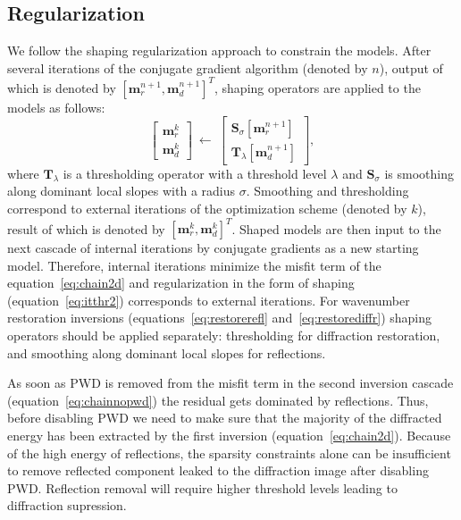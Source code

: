 \subsection{Regularization}
We follow the shaping regularization approach \cite[]{fomel2007shaping} to constrain the models. 
After several iterations of the conjugate
gradient algorithm (denoted by $n$), output of which is denoted by $[\mathbf{m}_r^{n+1},\mathbf{m}_d^{n+1}]^T$,
shaping operators are applied to the models as follows:
\begin{equation}
\label{eq:itthr2}
\begin{bmatrix}\mathbf{m}_{r}^{k} \\ \mathbf{m}_d^k\end{bmatrix}\ \leftarrow\ \begin{bmatrix} \mathbf{S}_{\sigma}[\mathbf{m}_{r}^{n+1}] \\ \mathbf{T}_{\lambda}[\mathbf{m}_{d}^{n+1}]\end{bmatrix},
\end{equation}
where $\mathbf{T}_{\lambda}$ is a thresholding operator with a threshold level $\lambda$ and $\mathbf{S}_{\sigma}$ is smoothing
along dominant local slopes with a radius $\sigma$. Smoothing and thresholding correspond to external iterations of the
optimization scheme (denoted by $k$), result of which is denoted by $[\mathbf{m}_r^k,\mathbf{m}_d^k]^T$.
Shaped models are then input to the next
cascade of internal iterations by conjugate gradients as a new starting model. Therefore, internal iterations minimize the misfit
term of the equation~\ref{eq:chain2d} and
regularization in the form of shaping (equation~\ref{eq:itthr2}) corresponds to external iterations.
For
wavenumber restoration inversions (equations~\ref{eq:restorerefl} and~\ref{eq:restorediffr}) shaping operators should be applied separately: thresholding for diffraction restoration, and smoothing
along dominant local slopes for reflections.

As soon as PWD is removed from the misfit term in the second inversion cascade (equation~\ref{eq:chainnopwd}) the residual gets dominated by reflections.
Thus, before disabling PWD we need to make sure that the majority of the diffracted energy has been extracted by the first inversion (equation~\ref{eq:chain2d}).
Because of the high energy of reflections, the sparsity constraints
alone
can be insufficient to remove reflected component leaked to the diffraction image after disabling PWD.
Reflection removal will require higher threshold levels leading to diffraction supression.

